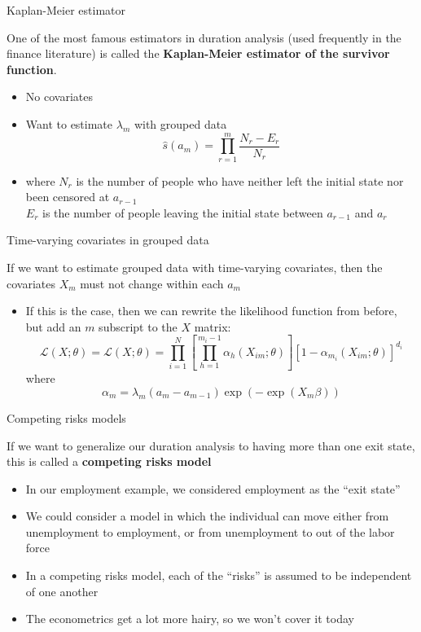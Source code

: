 \documentclass[english,xcolor=dvipsnames]{beamer}
\begin{document}
\begin{frame}{Kaplan-Meier estimator}

One of the most famous estimators in duration analysis (used frequently
in the finance literature) is called the \textbf{Kaplan-Meier estimator
of the survivor function}.
\begin{itemize}
\item No covariates
\item Want to estimate $\lambda_{m}$ with grouped data
\[
\hat{s}\left(a_{m}\right)=\prod_{r=1}^{m}\frac{N_{r}-E_{r}}{N_{r}}
\]

\item where $N_{r}$ is the number of people who have neither left the initial
state nor been censored at $a_{r-1}$\\
$E_{r}$ is the number of people leaving the initial state between
$a_{r-1}$ and $a_{r}$
\end{itemize}

\end{frame}


\begin{frame}{Time-varying covariates in grouped data}

If we want to estimate grouped data with time-varying covariates,
then the covariates $X_{m}$ must not change within each $a_{m}$
\begin{itemize}
\item If this is the case, then we can rewrite the likelihood function from
before, but add an $m$ subscript to the $X$ matrix:
\[
\mathcal{L}\left(X;\theta\right)=\mathcal{L}\left(X;\theta\right)=\prod_{i=1}^{N}\left[\prod_{h=1}^{m_{i}-1}\alpha_{h}\left(X_{im};\theta\right)\right]\left[1-\alpha_{m_{i}}\left(X_{im};\theta\right)\right]^{d_{i}}
\]
where
\[
\alpha_{m}=\lambda_{m}\left(a_{m}-a_{m-1}\right)\exp\left(-\exp\left(X_{m}\beta\right)\right)
\]

\end{itemize}

\end{frame}


\begin{frame}{Competing risks models}

If we want to generalize our duration analysis to having more than
one exit state, this is called a \textbf{competing risks model}
\begin{itemize}
\item In our employment example, we considered employment as the {}``exit
state''
\item We could consider a model in which the individual can move either
from unemployment to employment, or from unemployment to out of the
labor force
\item In a competing risks model, each of the {}``risks'' is assumed to
be independent of one another
\item The econometrics get a lot more hairy, so we won't cover it today
\end{itemize}

\end{frame}
\end{document}
